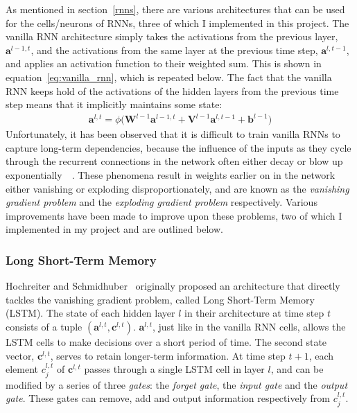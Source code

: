 \documentclass[a4paper, 12pt]{report}
\newcommand{\tit}[1]{\textit{#1}}
\begin{document}
As mentioned in section~\ref{rnns}, there are various architectures that can be used for the cells/neurons of RNNs, three of which I implemented in this project. The vanilla RNN architecture simply takes the activations from the previous layer, $\mathbf{a}^{l - 1, t}$, and the activations from the same layer at the previous time step, $\mathbf{a}^{l, t - 1}$, and applies an activation function to their weighted sum. This is shown in equation~\ref{eq:vanilla_rnn}, which is repeated below. The fact that the vanilla RNN keeps hold of the activations of the hidden layers from the previous time step means that it implicitly maintains some state:
\begin{gather*}
	\mathbf{a}^{l, t} = \phi \big( \mathbf{W}^{l - 1} \mathbf{a}^{l - 1, t} + \mathbf{V}^{l - 1} \mathbf{a}^{l, t - 1} + \mathbf{b}^{l - 1} \big)
\end{gather*}
Unfortunately, it has been observed that it is difficult to train vanilla RNNs to capture long-term dependencies, because the influence of the inputs as they cycle through the recurrent connections in the network often either decay or blow up exponentially~\cite{vanishing_gradient:hochreiter1991}~\cite{vanishing_gradient:bengio1994}. These phenomena result in weights earlier on in the network either vanishing or exploding disproportionately, and are known as the \tit{vanishing gradient problem} and the \tit{exploding gradient problem} respectively. Various improvements have been made to improve upon these problems, two of which I implemented in my project and are outlined below.

\subsubsection{Long Short-Term Memory}

Hochreiter and Schmidhuber~\cite{lstm:hochreiter1997} originally proposed an architecture that directly tackles the vanishing gradient problem, called Long Short-Term Memory (LSTM). The state of each hidden layer $l$ in their architecture at time step $t$ consists of a tuple $(\mathbf{a}^{l, t}, \mathbf{c}^{l, t})$. $\mathbf{a}^{l, t}$, just like in the vanilla RNN cells, allows the LSTM cells to make decisions over a short period of time. The second state vector, $\mathbf{c}^{l, t}$, serves to retain longer-term information. At time step $t + 1$, each element $c_j^{l, t}$ of $\mathbf{c}^{l, t}$ passes through a single LSTM cell in layer $l$, and can be modified by a series of three \tit{gates}: the \tit{forget gate}, the \tit{input gate} and the \tit{output gate}. These gates can remove, add and output information respectively from $c_j^{l, t}$. \\
\end{document}
